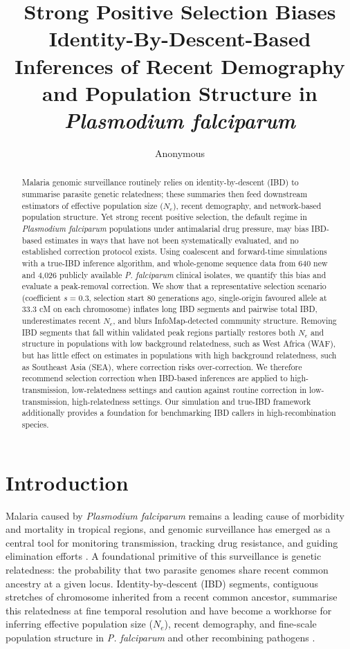 \documentclass[11pt]{article}
\title{Strong Positive Selection Biases Identity-By-Descent-Based Inferences of Recent Demography and Population Structure in \textit{Plasmodium falciparum}}
\author{Anonymous}
\date{}
\begin{document}
\maketitle

\begin{abstract}
Malaria genomic surveillance routinely relies on identity-by-descent (IBD) to summarise parasite genetic relatedness; these summaries then feed downstream estimators of effective population size ($N_e$), recent demography, and network-based population structure. Yet strong recent positive selection, the default regime in \textit{Plasmodium falciparum} populations under antimalarial drug pressure, may bias IBD-based estimates in ways that have not been systematically evaluated, and no established correction protocol exists. Using coalescent and forward-time simulations with a true-IBD inference algorithm, and whole-genome sequence data from 640 new and 4,026 publicly available \textit{P. falciparum} clinical isolates, we quantify this bias and evaluate a peak-removal correction. We show that a representative selection scenario (coefficient $s = 0.3$, selection start $80$ generations ago, single-origin favoured allele at $33.3$ cM on each chromosome) inflates long IBD segments and pairwise total IBD, underestimates recent $N_e$, and blurs InfoMap-detected community structure. Removing IBD segments that fall within validated peak regions partially restores both $N_e$ and structure in populations with low background relatedness, such as West Africa (WAF), but has little effect on estimates in populations with high background relatedness, such as Southeast Asia (SEA), where correction risks over-correction. We therefore recommend selection correction when IBD-based inferences are applied to high-transmission, low-relatedness settings and caution against routine correction in low-transmission, high-relatedness settings. Our simulation and true-IBD framework additionally provides a foundation for benchmarking IBD callers in high-recombination species.
\end{abstract}

\section{Introduction}

Malaria caused by \textit{Plasmodium falciparum} remains a leading cause of morbidity and mortality in tropical regions, and genomic surveillance has emerged as a central tool for monitoring transmission, tracking drug resistance, and guiding elimination efforts \citep{who2022worldmalaria,malariagen2021pf6}. A foundational primitive of this surveillance is genetic relatedness: the probability that two parasite genomes share recent common ancestry at a given locus. Identity-by-descent (IBD) segments, contiguous stretches of chromosome inherited from a recent common ancestor, summarise this relatedness at fine temporal resolution and have become a workhorse for inferring effective population size ($N_e$), recent demography, and fine-scale population structure in \textit{P. falciparum} and other recombining pathogens \citep{schaffner2018hmmibd,henden2018isorelate,taylor2019ibd}.
\end{document}
